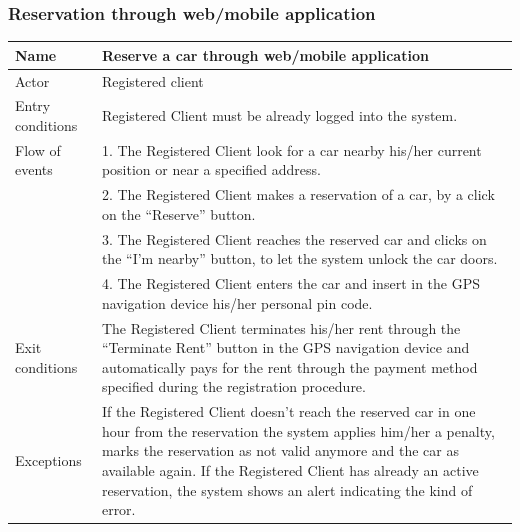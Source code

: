 \subsubsection{Reservation through web/mobile application}
\begin{table}[!h]
\begin{tabularx}{\linewidth}{l|X}
\centering
Name & Reserve a car through web/mobile application \\ \hline
Actor & Registered client \\ \hline
Entry conditions & Registered Client must be already logged into the system. \\ \hline
Flow of events & 1. The Registered Client look for a car nearby his/her current position or near a specified address. \\
& 2. The Registered Client makes a reservation of a car, by a click on the “Reserve” button.\\
& 3. The Registered Client reaches the reserved car and clicks on the “I’m nearby” button, to let the system unlock the car doors. \\
& 4. The Registered Client enters the car and insert in the GPS navigation device his/her personal pin code. \\ \hline
Exit conditions & The Registered Client terminates his/her rent through the “Terminate Rent” button in the GPS navigation device and automatically pays for the rent through the payment method specified during the registration procedure. \\ \hline
Exceptions & If the Registered Client doesn’t reach the reserved car in one hour from the reservation the system applies him/her a penalty, marks the reservation as not valid anymore and the car as available again. If the Registered Client has already an active reservation, the system shows an alert indicating the kind of error. \\
\end{tabularx}
\end{table}

\clearpage
